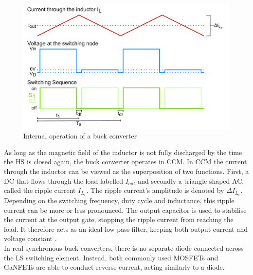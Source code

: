\begin{figure}[H]
    \centering
    \includegraphics[width=1\linewidth]{Bilder//Kapitel2/BuckConverter_Stages_3.pdf}
    \caption{Internal operation of a buck converter}
    \label{fig:stages_of_a_buck_converter}
\end{figure}

As long as the magnetic field of the inductor is not fully discharged by the time the \ac{HS} is closed again, the buck converter operates in \ac{CCM}. In \ac{CCM} the current through the inductor can be viewed as the superposition of two functions. First, a \ac{DC} that flows through the load labelled $I_{out}$ and secondly a triangle shaped \ac{AC}, called the ripple current $I_{L_r}$. The ripple current's amplitude is denoted by $\Delta I_{L_r}$. Depending on the switching frequency, duty cycle and inductance, this ripple current can be more or less pronounced. The output capacitor is used to stabilise the current at the output gate, stopping the ripple current from reaching the load. It therefore acts as an ideal low pass filter, keeping both output current and voltage constant \cite{zehendnerPowerTopologiesHandbook2016,haukeBasicCalculationBuck2015}.\\
In real synchronous buck converters, there is no separate diode connected across the \ac{LS} switching element. Instead, both commonly used \acp{MOSFET} and \acp{GaNFET} are able to conduct reverse current, acting similarly to a diode. \\

